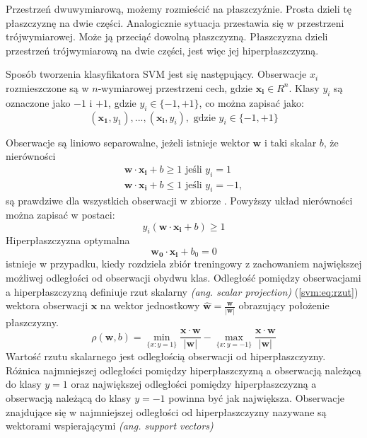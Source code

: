 \documentclass[a4paper,12pt,twoside,openany]{report}
\newcommand{\ang}[1]{\textit{(ang. #1)}}
\newcommand{\Eq}[1]{(\ref{#1})}
\renewcommand{\vec}[1]{\bm{#1}}
\begin{document}
Przestrzeń dwuwymiarową, możemy rozmieścić na płaszczyźnie. 
Prosta dzieli tę płaszczyznę na dwie części.
Analogicznie sytuacja przestawia się w przestrzeni trójwymiarowej.
Może ją przeciąć dowolną płaszczyzną.
Płaszczyzna dzieli przestrzeń trójwymiarową na dwie części, jest więc jej hiperpłaszczyzną.

Sposób tworzenia klasyfikatora SVM jest się następujący.
Obserwacje $x_i$ rozmieszczone są w $n$-wymiarowej przestrzeni cech, gdzie $\vec{x_i} \in R^n$.
Klasy $y_i$ są oznaczone jako $-1$ i $+1$, gdzie $y_i \in \{-1, +1\}$, co można zapisać jako:
\begin{equation}
	(\bm{x_1},y_1), ..., (\bm{x_i}, y_i), \textrm{ gdzie } y_i \in \{-1, +1\}
\end{equation}

Obserwacje są liniowo separowalne, jeżeli istnieje wektor $\bm{w}$ i taki skalar $b$, że nierówności
\begin{gather}
	\bm{w} \cdot \bm{x_i} + b \geq 1 \textrm{ jeśli } y_i = 1\\
	\bm{w} \cdot \bm{x_i} + b \leq 1 \textrm{ jeśli } y_i = -1,
\end{gather}
są prawdziwe dla wszystkich obserwacji w zbiorze \cite{Cortes1995}.
Powyższy układ nierówności można zapisać w postaci:
\begin{equation}
	y_i(\bm{w} \cdot \bm{x_i} + b) \geq 1
\end{equation}
Hiperpłaszczyzna optymalna 
\begin{equation}
	\bm{w_0} \cdot \bm{x_i}  + b_0 = 0
\end{equation}
istnieje w przypadku, kiedy rozdziela zbiór treningowy z zachowaniem największej możliwej odległości od obserwacji obydwu klas.
Odległość pomiędzy obserwacjami a hiperpłaszczyzną definiuje
rzut skalarny \ang{scalar projection} \Eq{svm:eq:rzut} wektora obserwacji $\bm{x}$ na wektor jednostkowy $\hat{\bm{w}} = \frac{\bm{w}}{|\bm{w}|}$
obrazujący położenie płaszczyzny.
\begin{equation}
	\rho(\bm{w}, b) = \min\limits_{\{x:y=1\}} \frac{\bm{x} \cdot \bm{w}} {|\bm{w}|} - \max\limits_{\{x:y=-1\}}  \frac{\bm{x} \cdot \bm{w}} {|\bm{w}|} 
	\label{svm:eq:rzut}
\end{equation}
Wartość rzutu skalarnego jest odległością obserwacji od hiperpłaszczyzny. 
Różnica najmniejszej odległości pomiędzy hiperpłaszczyzną a obserwacją należącą do klasy $y=1$
oraz największej odległości pomiędzy hiperpłaszczyzną a obserwacją należącą do klasy $y=-1$ 
powinna być jak największa.
Obserwacje znajdujące się w najmniejszej odległości od hiperpłaszczyzny nazywane są wektorami wspierającymi \ang{support vectors}
\end{document}
